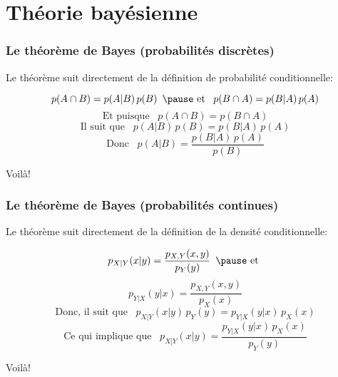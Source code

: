 \documentclass{beamer}
\begin{document}



\section{Théorie bayésienne}


\begin{frame}
    \frametitle{Le théorème de Bayes (probabilités discrètes)}
    Le théorème suit directement de la définition de probabilité conditionnelle:

    \pause

    \[p(A \cap B) =  p(A | B) \, p(B) \,\,\, \pause \textrm{ et } \,\,\, p(B \cap A) =  p(B | A) \, p(A)\]
    \pause
    \[\textrm{Et puisque } \,\,\, p(A \cap B) = p(B \cap A)\]
    \pause
    \[\textrm{Il suit que } \,\,\, p(A | B) \, p(B) = p(B | A) \, p(A)\]
    \pause
    \[\textrm{Donc } \,\,\, p(A | B) = \frac{p(B | A) \, p(A)}{p(B)}\]
    
    Voilà!
\end{frame}


\begin{frame}
    \frametitle{Le théorème de Bayes (probabilités continues)}
    Le théorème suit directement de la définition de la densité conditionnelle:

    \pause

    \[p_{X|Y}(x|y) = \frac{p_{X,Y}(x,y)}{p_Y(y)} \,\,\, \pause \textrm{ et }\]
    \[p_{Y|X}(y|x) = \frac{p_{X,Y}(x,y)}{p_X(x)}\]
    \pause
    \[\textrm{Donc, il suit que } \,\,\, p_{X|Y}(x|y) \, p_Y(y) = p_{Y|X}(y|x) \, p_X(x)\]
    \pause
    \[\textrm{Ce qui implique que } \,\,\, p_{X|Y}(x|y) = \frac{p_{Y|X}(y|x) \, p_X(x)}{p_Y(y)}\]

    Voilà!
\end{frame}
\end{document}

